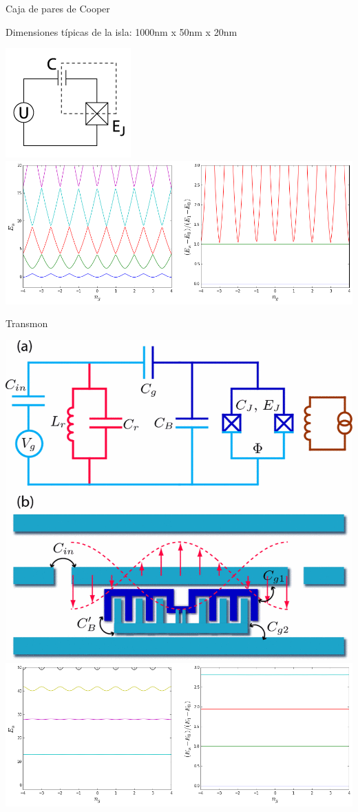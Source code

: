 \documentclass[spanish]{beamer}
\begin{document}
\begin{frame}{Caja de pares de Cooper}
\protect\hypertarget{caja-de-pares-de-cooper}{}

Dimensiones típicas de la isla: 1000nm x 50nm x 20nm

\includegraphics[width=0.5\linewidth]{Avance1/cooperpairbox.png}\includegraphics[width=0.5\linewidth]{Avance1/cooperenergy.png}

\end{frame}

\begin{frame}{Transmon}
\protect\hypertarget{transmon}{}

\includegraphics[width=0.5\linewidth]{Avance1/transmon.png}\includegraphics[width=0.5\linewidth]{Avance1/transmonenergy.png}

\end{frame}
\end{document}

